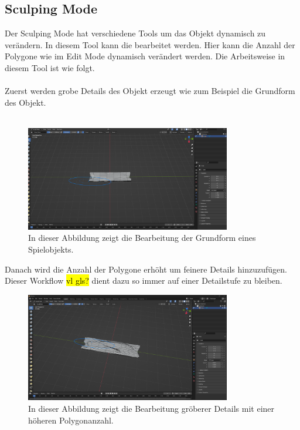 \subsection{Sculping Mode}
Der Sculping Mode hat verschiedene Tools um das Objekt dynamisch zu verändern. In diesem Tool kann die  bearbeitet werden. Hier kann die Anzahl der Polygone wie im Edit Mode dynamisch verändert werden. Die Arbeitsweise in diesem Tool ist wie folgt.\\\\
Zuerst werden grobe Details des Objekt erzeugt wie zum Beispiel die Grundform des Objekt.\\\\
\begin{figure}[H]
    \centering
    \includegraphics[width=0.8\textwidth]{chapters/13/images/HolzBrett.png}
    \caption{In dieser Abbildung zeigt die Bearbeitung der Grundform eines Spielobjekts.}
    \label{UST-14}
\end{figure}
\noindent Danach wird die Anzahl der Polygone erhöht um feinere Details hinzuzufügen. Dieser Workflow \hl{vl gls?} dient dazu so immer auf einer Detailstufe zu bleiben.
\begin{figure}[H]
    \centering
    \includegraphics[width=0.8\textwidth]{chapters/13/images/HolzBrett1.png}
    \caption{In dieser Abbildung zeigt die Bearbeitung gröberer Details mit einer höheren Polygonanzahl.}
    \label{UST-15}
\end{figure}
